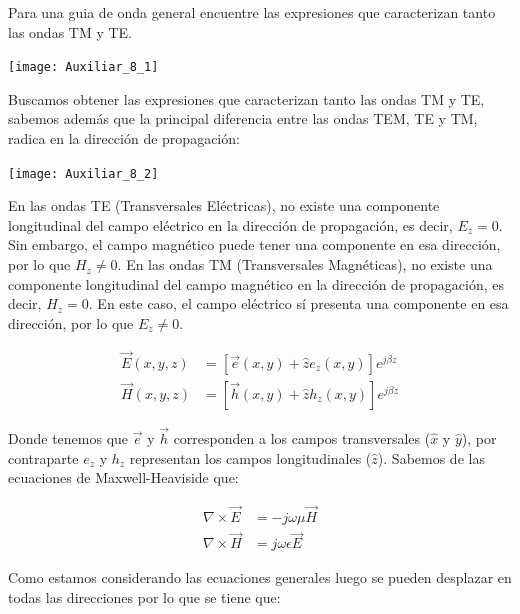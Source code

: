 \documentclass[
  11pt,
  letterpaper,
   addpoints,
   answers
  ]{exam}
\begin{document}
\vspace{0.5cm}
\noindent
\vspace{.85cm}
\begin{questions}
    \question Para una guia de onda general encuentre las expresiones que caracterizan tanto las ondas TM y TE.
  \begin{center}
        \texttt{[image: Auxiliar\_8\_1]}
      \end{center}
    \begin{solution}
        Buscamos obtener las expresiones que caracterizan tanto las ondas TM y TE, sabemos además que la principal diferencia entre las ondas TEM, TE y TM, radica en la dirección de propagación:

\begin{center}
    \texttt{[image: Auxiliar\_8\_2]}
\end{center}

En las ondas TE (Transversales Eléctricas), no existe una componente longitudinal del campo eléctrico en la dirección de propagación, es decir, $E_z = 0$. Sin embargo, el campo magnético puede tener una componente en esa dirección, por lo que $H_z \neq 0$. En las ondas TM (Transversales Magnéticas), no existe una componente longitudinal del campo magnético en la dirección de propagación, es decir, $H_z = 0$. En este caso, el campo eléctrico sí presenta una componente en esa dirección, por lo que $E_z \neq 0$.

\begin{align}
    \vec{E}(x, y, z) &= [\vec{e}(x, y) + \hat{z}e_z(x, y)]e^{j\beta z} \tag{1}\\
    \vec{H}(x, y, z) &= [\vec{h}(x, y) + \hat{z}h_z(x, y)]e^{j\beta z} \tag{2}
\end{align}

Donde tenemos que $\vec{e}$ y $\vec{h}$ corresponden a los campos transversales ($\hat{x}$ y $\hat{y}$), por contraparte $e_z$ y $h_z$ representan los campos longitudinales ($\hat{z}$). Sabemos de las ecuaciones de Maxwell-Heaviside que:

\begin{align}
    \nabla \times \vec{E} &= -j\omega\mu \vec{H} \tag{3} \\
    \nabla \times \vec{H} &= j\omega\epsilon \vec{E} \tag{4}
\end{align}

Como estamos considerando las ecuaciones generales luego se pueden desplazar en todas las direcciones por lo que se tiene que:


\end{solution}
\end{questions}
\end{document}
